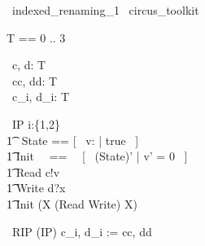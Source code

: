 \begin{zsection}
  \SECTION\ indexed\_renaming\_1 \parents\ circus\_toolkit
\end{zsection}

\begin{zed}
	T == 0 .. 3 
\end{zed}

\begin{circus}
	\circchannel\ c, d: T \\
	\circchannel\ cc, dd: T \cross \nat \\
	\circchannel\ c\_i, d\_i: T \cross \nat \\
\end{circus}

\begin{circus}
    \circprocess\ IP \circdef i:\{1,2\} \circindex \circbegin \\
        \t1 \circstate\ State == [~ v: \nat | true ~] \\
        \t1 Init ~~==~~ [~ (State)' | v' = 0 ~] \\
        \t1 Read \circdef c!v \then \Skip \\
        \t1 Write \circdef d?x \then \Skip \\
        \t1 \circspot \lschexpract Init \rschexpract \circseq (\circmu X \circspot (Read \extchoice Write) \circseq X) \\ 
	\circend
\end{circus}

\begin{circus}
    \circprocess\ RIP \circdef (IP) \lcircrename c\_i, d\_i := cc, dd \rcircrename \\
\end{circus}
